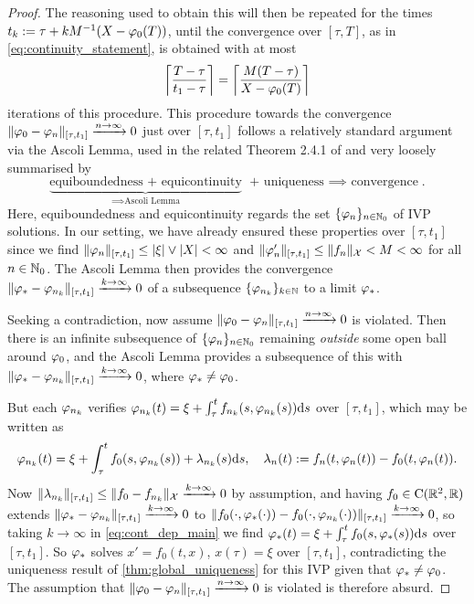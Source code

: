 \begin{proof}
    The reasoning used to obtain this will then be repeated for the times $t_k:=\tau + kM^{-1}(X-\varphi_0(T))$, until the convergence over $[\tau,T]$, as in \autoref{eq:continuity_statement}, is obtained with at most
    \begin{equation}\label{eq:num_its}
        \left\lceil\frac{T-\tau}{t_1-\tau}\right\rceil = \left\lceil\frac{M(T-\tau)}{X - \varphi_0(T)}\right\rceil
    \end{equation}
    iterations of this procedure. This procedure towards the convergence $\Vert \varphi_0 - \varphi_n\Vert_{[\tau,t_1]} \xrightarrow{n\to\infty}0$ just over $[\tau,t_1]$ follows a relatively standard argument via the Ascoli Lemma, used in the related Theorem 2.4.1 of \cite{coddington_1955} and very loosely summarised by
    \begin{equation}\label{eq:approach_summary}
        \underbrace{\text{equiboundedness + equicontinuity}}_{\text{$\implies$Ascoli Lemma}}\text{ + uniqueness $\implies$ convergence}.
    \end{equation}
    Here, equiboundedness and equicontinuity regards the set $\{\varphi_n\}_{n\in\mathbb{N}_0}$ of IVP solutions. In our setting, we have already ensured these properties over $[\tau,t_1]$ since we find $\Vert\varphi_n\Vert_{[\tau,t_1]}\le|\xi|\vee|X|<\infty$ and $\Vert\varphi'_n\Vert_{[\tau,t_1]}\le \Vert f_n \Vert_{\mathcal{X}} <M<\infty$ for all $n\in\mathbb{N}_0$. The Ascoli Lemma then provides the convergence $\Vert\varphi_* - \varphi_{n_k}\Vert_{[\tau,t_1]}\xrightarrow{k\to\infty}0$ of a subsequence $\{\varphi_{n_k}\}_{k\in\mathbb{N}}$ to a limit $\varphi_*$.

    Seeking a contradiction, now assume $\Vert \varphi_0 - \varphi_n\Vert_{[\tau,t_1]} \xrightarrow{n\to\infty}0$ is violated. Then there is an infinite subsequence of $\{\varphi_n\}_{n\in\mathbb{N}_0}$ remaining \emph{outside} some open ball around $\varphi_0$, and the Ascoli Lemma provides a subsequence of this with $\Vert \varphi_* - \varphi_{n_k}\Vert_{[\tau,t_1]} \xrightarrow{k\to\infty}0$, where $\varphi_*\neq\varphi_0$.

    But each $\varphi_{n_k}$ verifies $\varphi_{n_k}(t)=\xi+\int_\tau^t f_{n_k}(s,\varphi_{n_k}(s))\mathrm{d} s$ over $[\tau,t_1]$, which may be written as
    \begin{equation}\label{eq:cont_dep_main}
        \varphi_{n_k}(t) = \xi + \int_\tau^t f_0(s,\varphi_{n_k}(s)) + \lambda_{n_k}(s)\mathrm{d} s,\quad \lambda_n(t) := f_n(t,\varphi_n(t)) - f_0(t,\varphi_n(t)).
    \end{equation}
    Now $\Vert \lambda_{n_k}\Vert_{[\tau,t_1]}\le \Vert f_0 - f_{n_k} \Vert_{\mathcal{X}} \xrightarrow{k\to\infty}0$ by assumption, and having $f_0\in\mathrm{C}(\mathbb{R}^2,\mathbb{R})$ extends $\Vert \varphi_* - \varphi_{n_k}\Vert_{[\tau,t_1]} \xrightarrow{k\to\infty}0$ to $\Vert f_0(\cdot,\varphi_*(\cdot)) - f_0(\cdot,\varphi_{n_k}(\cdot))\Vert_{[\tau,t_1]} \xrightarrow{k\to\infty}0$, so taking $k\to\infty$ in \autoref{eq:cont_dep_main} we find $\varphi_*(t)=\xi+\int_\tau^t f_0(s,\varphi_*(s))\mathrm{d} s$ over $[\tau,t_1]$. So $\varphi_*$ solves $x'=f_0(t,x)$, $x(\tau)=\xi$ over $[\tau,t_1]$, contradicting the uniqueness result of \autoref{thm:global_uniqueness} for this IVP given that $\varphi_*\neq\varphi_0$. The assumption that $\Vert \varphi_0 - \varphi_n\Vert_{[\tau,t_1]} \xrightarrow{n\to\infty}0$ is violated is therefore absurd.


\end{proof}
